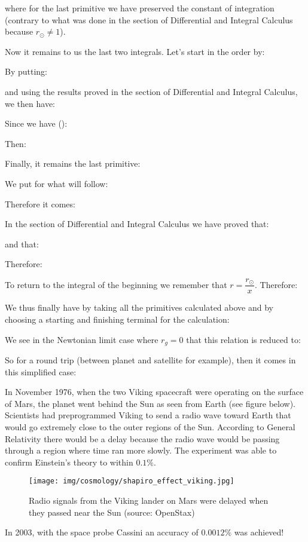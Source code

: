 	where for the last primitive we have preserved the constant of integration (contrary to what was done in the section of Differential and Integral Calculus because $r_\odot\neq 1$).

	Now it remains to us the last two integrals. Let's start in the order by:
	
	By putting:
	
	and using the results proved in the section of Differential and Integral Calculus, we then have:
	
	Since we have ():
	
	Then:
	
	Finally, it remains the last primitive:
	
	We put for what will follow:
	
	Therefore it comes:
	
	In the section of Differential and Integral Calculus we have proved that:
	
	and that:
	
	Therefore:
	
	To return to the integral of the beginning we remember that $r=\dfrac{r_\odot}{x}$. Therefore:
	
	We thus finally have by taking all the primitives calculated above and by choosing a starting and finishing terminal for the calculation:
	
	We see in the Newtonian limit case where $r_g=0$ that this relation is reduced to:
	
	So for a round trip (between planet and satellite for example), then it comes in this simplified case:
	
	In November 1976, when the two Viking spacecraft were operating on the surface of Mars, the planet went
behind the Sun as seen from Earth (see figure below). Scientists had preprogrammed Viking to send a radio wave toward Earth that would go extremely close to the outer regions of the Sun. According to General Relativity there would be a delay because the radio wave would be passing through a region where time ran more slowly. The experiment was able to confirm Einstein’s theory to within $0.1\%$.
	\begin{figure}[H]
		\centering
		\texttt{[image: img/cosmology/shapiro\_effect\_viking.jpg]}	
		\caption[Delayed Radio signals from the Viking lander on Mars]{Radio signals from the Viking lander on Mars were delayed when they passed near the Sun (source: OpenStax)}
	\end{figure}
	In 2003, with the space probe Cassini an accuracy of $0.0012\%$ was achieved!
	
